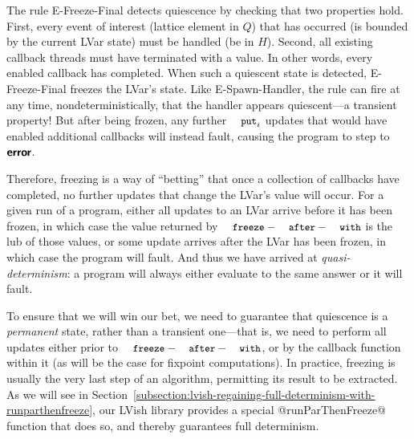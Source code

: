 The rule {\sc E-Freeze-Final} detects quiescence by checking that two
properties hold.  First, every event of interest (lattice element in
$Q$) that has occurred (is bounded by the current LVar state) must be
handled (be in $H$).  Second, all existing callback threads must have
terminated with a value.  In other words, every enabled callback has
completed.  When such a quiescent state is detected, {\sc
  E-Freeze-Final} freezes the LVar's state.  Like {\sc
  E-Spawn-Handler}, the rule can fire at any time,
nondeterministically, that the handler appears quiescent---a transient
property!  But after being frozen, any further $\PUTi$ updates that
would have enabled additional callbacks will instead fault, causing
the program to step to $\textbf{\textsf{error}}$.

Therefore, freezing is a way of ``betting'' that once a collection of
callbacks have completed, no further updates that change the LVar's
value will occur.  For a given run of a program, either all updates to
an LVar arrive before it has been frozen, in which case the value
returned by $\FAW$ is the lub of those values, or some update arrives
after the LVar has been frozen, in which case the program will fault.
And thus we have arrived at \emph{quasi-determinism}: a program will
always either evaluate to the same answer or it will fault.

To ensure that we will win our bet, we need to guarantee that
quiescence is a \emph{permanent} state, rather than a transient
one---that is, we need to perform all updates either prior to $\FAW$,
or by the callback function within it (as will be the case for
fixpoint computations).  In practice, freezing is usually the very
last step of an algorithm, permitting its result to be extracted. As
we will see in
Section~\ref{subsection:lvish-regaining-full-determinism-with-runparthenfreeze},
our LVish library provides a special @runParThenFreeze@ function that
does so, and thereby guarantees full determinism.
